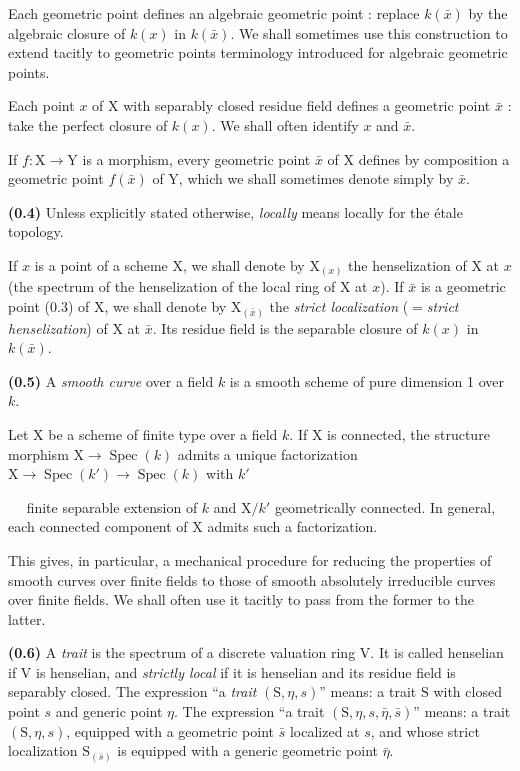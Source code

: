 \documentclass[11pt,leqno]{article}
\newcommand{\Page}[1]{\ifvmode\noindent\else\unskip\ \fi{\footnotesize\textcolor{gray}{[p.\,#1]}}\ \ignorespaces}
\begin{document}
Each geometric point defines an algebraic geometric point : replace \(k(\bar{x})\) by the algebraic closure of \(k(x)\) in \(k(\bar{x})\). We shall sometimes use this construction to extend tacitly to geometric points terminology introduced for algebraic geometric points.

Each point \(x\) of \(\mathrm{X}\) with separably closed residue field defines a geometric point \(\bar{x}\) : take the perfect closure of \(k(x)\). We shall often identify \(x\) and \(\bar{x}\).

If \(f:\mathrm{X}\to\mathrm{Y}\) is a morphism, every geometric point \(\bar{x}\) of \(\mathrm{X}\) defines by composition a geometric point \(f(\bar{x})\) of \(\mathrm{Y}\), which we shall sometimes denote simply by \(\bar{x}\).

\textbf{(0.4)} Unless explicitly stated otherwise, \textit{locally} means locally for the étale topology.

If \(x\) is a point of a scheme \(\mathrm{X}\), we shall denote by \(\mathrm{X}_{(x)}\) the henselization of \(\mathrm{X}\) at \(x\) (the spectrum of the henselization of the local ring of \(\mathrm{X}\) at \(x\)). If \(\bar{x}\) is a geometric point (0.3) of \(\mathrm{X}\), we shall denote by \(\mathrm{X}_{(\bar{x})}\) the \textit{strict localization} (\(=\)\textit{strict henselization}) of \(\mathrm{X}\) at \(\bar{x}\). Its residue field is the separable closure of \(k(x)\) in \(k(\bar{x})\).

\textbf{(0.5)} A \textit{smooth curve} over a field \(k\) is a smooth scheme of pure dimension 1 over \(k\).

Let \(\mathrm{X}\) be a scheme of finite type over a field \(k\). If \(\mathrm{X}\) is connected, the structure morphism \(\mathrm{X}\to\operatorname{Spec}(k)\) admits a unique factorization \(\mathrm{X}\to\operatorname{Spec}(k')\to\operatorname{Spec}(k)\) with \(k'\)

\Page{145}
finite separable extension of \(k\) and \(\mathrm{X}/k'\) geometrically connected. In general, each connected component of \(\mathrm{X}\) admits such a factorization.

This gives, in particular, a mechanical procedure for reducing the properties of smooth curves over finite fields to those of smooth absolutely irreducible curves over finite fields. We shall often use it tacitly to pass from the former to the latter.

\textbf{(0.6)} A \textit{trait} is the spectrum of a discrete valuation ring \(\mathrm{V}\). It is called henselian if \(\mathrm{V}\) is henselian, and \textit{strictly local} if it is henselian and its residue field is separably closed. The expression “a \textit{trait} \((\mathrm{S},\eta,s)\)” means: a trait \(\mathrm{S}\) with closed point \(s\) and generic point \(\eta\). The expression “a trait \((\mathrm{S},\eta,s,\bar\eta,\bar s)\)” means: a trait \((\mathrm{S},\eta,s)\), equipped with a geometric point \(\bar s\) localized at \(s\), and whose strict localization \(\mathrm{S}_{(\bar s)}\) is equipped with a generic geometric point \(\bar\eta\).
\end{document}

